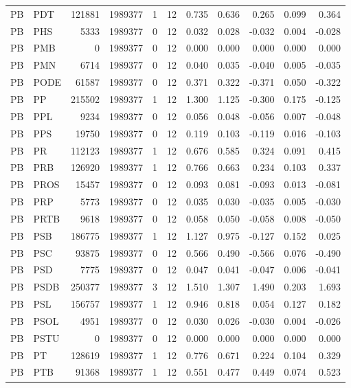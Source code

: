 \begin{landscape}
\begin{longtable}{llrrrrrrrrr}
PB & PDT & 121881 & 1989377 & 1 & 12 & 0.735 & 0.636 & 0.265 & 0.099 & 0.364 \\
PB & PHS & 5333 & 1989377 & 0 & 12 & 0.032 & 0.028 & -0.032 & 0.004 & -0.028 \\
PB & PMB & 0 & 1989377 & 0 & 12 & 0.000 & 0.000 & 0.000 & 0.000 & 0.000 \\
PB & PMN & 6714 & 1989377 & 0 & 12 & 0.040 & 0.035 & -0.040 & 0.005 & -0.035 \\
PB & PODE & 61587 & 1989377 & 0 & 12 & 0.371 & 0.322 & -0.371 & 0.050 & -0.322 \\
PB & PP & 215502 & 1989377 & 1 & 12 & 1.300 & 1.125 & -0.300 & 0.175 & -0.125 \\
PB & PPL & 9234 & 1989377 & 0 & 12 & 0.056 & 0.048 & -0.056 & 0.007 & -0.048 \\
PB & PPS & 19750 & 1989377 & 0 & 12 & 0.119 & 0.103 & -0.119 & 0.016 & -0.103 \\
PB & PR & 112123 & 1989377 & 1 & 12 & 0.676 & 0.585 & 0.324 & 0.091 & 0.415 \\
PB & PRB & 126920 & 1989377 & 1 & 12 & 0.766 & 0.663 & 0.234 & 0.103 & 0.337 \\
PB & PROS & 15457 & 1989377 & 0 & 12 & 0.093 & 0.081 & -0.093 & 0.013 & -0.081 \\
PB & PRP & 5773 & 1989377 & 0 & 12 & 0.035 & 0.030 & -0.035 & 0.005 & -0.030 \\
PB & PRTB & 9618 & 1989377 & 0 & 12 & 0.058 & 0.050 & -0.058 & 0.008 & -0.050 \\
PB & PSB & 186775 & 1989377 & 1 & 12 & 1.127 & 0.975 & -0.127 & 0.152 & 0.025 \\
PB & PSC & 93875 & 1989377 & 0 & 12 & 0.566 & 0.490 & -0.566 & 0.076 & -0.490 \\
PB & PSD & 7775 & 1989377 & 0 & 12 & 0.047 & 0.041 & -0.047 & 0.006 & -0.041 \\
PB & PSDB & 250377 & 1989377 & 3 & 12 & 1.510 & 1.307 & 1.490 & 0.203 & 1.693 \\
PB & PSL & 156757 & 1989377 & 1 & 12 & 0.946 & 0.818 & 0.054 & 0.127 & 0.182 \\
PB & PSOL & 4951 & 1989377 & 0 & 12 & 0.030 & 0.026 & -0.030 & 0.004 & -0.026 \\
PB & PSTU & 0 & 1989377 & 0 & 12 & 0.000 & 0.000 & 0.000 & 0.000 & 0.000 \\
PB & PT & 128619 & 1989377 & 1 & 12 & 0.776 & 0.671 & 0.224 & 0.104 & 0.329 \\
PB & PTB & 91368 & 1989377 & 1 & 12 & 0.551 & 0.477 & 0.449 & 0.074 & 0.523 \\

\end{longtable}
\end{landscape}
